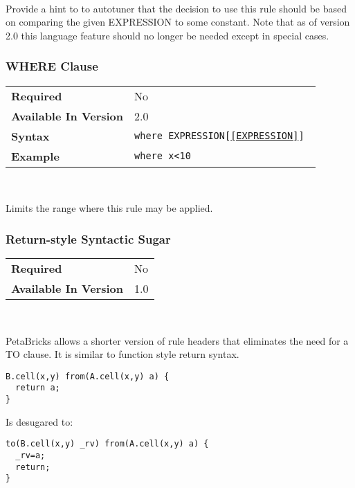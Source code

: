\documentclass[11pt]{article}
\begin{document}
~

\noindent Provide a hint to to autotuner that the decision to use this
rule should be based on comparing the given EXPRESSION to some constant.
Note that as of version 2.0 this language feature should no longer be needed
except in special cases.


\subsubsection{WHERE Clause}
\begin{tabular}{| l | l |}
\hline
\bf Required & No                          \\
\bf Available In Version & 2.0             \\
\bf Syntax & \tt where EXPRESSION[\ref{EXPRESSION}] \\
\bf Example & \tt where x<10               \\
\hline
\end{tabular}

~

\noindent Limits the range where this rule may be applied.

\noindent 

\subsubsection{Return-style Syntactic Sugar}

\begin{tabular}{| l | l |}
\hline
\bf Required & No \\
\bf Available In Version & 1.0        \\
\hline
\end{tabular}

~

PetaBricks allows a shorter version of rule headers that eliminates
the need for a TO clause.  It is similar to function style return syntax.
 
\begin{minipage}{\linewidth}
\begin{lstlisting}
B.cell(x,y) from(A.cell(x,y) a) {
  return a;
}
\end{lstlisting}
\end{minipage}
Is desugared to:

\begin{minipage}{\linewidth}
\begin{lstlisting}
to(B.cell(x,y) _rv) from(A.cell(x,y) a) {
  _rv=a;
  return;
}
\end{lstlisting}
\end{minipage}
\end{document}
